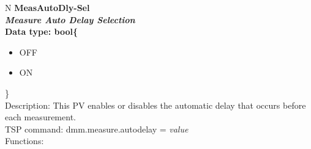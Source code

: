 \documentclass[openany]{article}
\begin{document}
		\begin{tabular}{N}
			\hline
			\bfseries MeasAutoDly-Sel\label{pv:measautodly-sel} \\ \hline
			\emph{Measure Auto Delay Selection} \\
			Data type: bool\{\begin{itemize}[noitemsep]
				\small
				\item[] OFF
				\item[] ON
			\end{itemize}\} \\
			Description: This PV enables or disables the automatic delay that occurs before each measurement. \\
			TSP command: dmm.measure.autodelay = \emph{value} \\
			Functions: \\
			\arrayrulecolor{\FuncTableBorderColor}

		\end{tabular}
\end{document}
